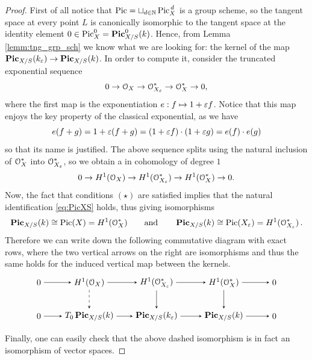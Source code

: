 	\begin{proof}
		First of all notice that $\operatorname{Pic} = \sqcup_{d\in \mathbb{N}}\operatorname{Pic}^{\,d}_X$ is a group scheme, so the tangent space at every point $L$ is canonically isomorphic to the tangent space at the identity element $ 0\in \operatorname{Pic}^0_X = \operatorname{\mathbf{Pic}}_{X/S}^0(k)$.
		Hence, from Lemma \ref{lemm:tng_grp_sch} we know what we are looking for: the kernel of the map $ \operatorname{\mathbf{Pic}}_{X/S}(k_\varepsilon)\to  \operatorname{\mathbf{Pic}}_{X/S}(k)$. In order to compute it, consider the truncated exponential sequence
		$$ 0 \to \mathcal{O}_X \to \mathcal{O}_{X_\varepsilon}^* \to \mathcal{O}_X^* \to 0, $$
		where the first map is the exponentiation $e: f\mapsto 1+\varepsilon f$. Notice that this map enjoys the key property of the classical exponential, as we have 
		$$ e(f + g) = 1+\varepsilon(f+g) = (1+\varepsilon f)\cdot(1+\varepsilon g) = e(f) \cdot e(g) $$
		so that its name is justified. The above sequence splits using the natural inclusion of $\mathcal{O}_X^*$ into $\mathcal{O}_{X_\varepsilon}^*$, so we obtain a \ses in cohomology of degree $1$
		$$ 0 \to H^1(\mathcal{O}_X) \to H^1(\mathcal{O}_{X_\varepsilon}^*) \to H^1(\mathcal{O}_X^*) \to 0. $$
		Now, the fact that conditions $(\star)$ are satisfied implies that the natural identification \eqref{eq:PicXS} holds, thus giving isomorphisms
		$$ \operatorname{\mathbf{Pic}}_{X/S}(k) \cong \operatorname{Pic}(X) = H^1(\mathcal{O}_X^*) \qquad \text{and} \qquad \operatorname{\mathbf{Pic}}_{X/S}(k) \cong \operatorname{Pic}(X_\varepsilon) = H^1(\mathcal{O}_{X_\varepsilon}^*)\,. $$
		Therefore we can write down the following commutative diagram with exact rows, where the two vertical arrows on the right are isomorphisms and thus the same holds for the induced vertical map between the kernels.
		$$
		\begin{tikzpicture}[node distance=4em, auto]
			\node (O) 															{$0$};
			\node (A) 	[right of=O, xshift=2em]		{$H^1(\OX)$};
			\node (A2) 	[right of=A]								{$\;$};
			\node (B) 	[right of=A2]								{$H^1(\calO_{X_\eps}^*)$};
			\node (B2) 	[right of=B]								{$\;$};
		  \node (C) 	[right of=B2] 							{$H^1(\OX^*)$};
		  \node (OO) 	[right of=C, xshift=2em] 		{$0$};
		  \node (O') 	[below of=O] 								{$0$};
		  \node (A') 	[below of=A] 								{$T_0 \PicXS(k)$};
		  \node (B') 	[below of=B] 								{$ \PicXS(k_\eps)$};
		  \node (C') 	[below of=C] 								{$ \PicXS(k)$};
		  \node (OO') [below of=OO] 							{$0$};
		  \draw[-stealth] 				(O)	to node {} (A);
		  \draw[-stealth]					(A)		to node {} (B);
		  \draw[-stealth]					(B)		to node {} (C);
		  \draw[-stealth]					(C)		to node {} (OO);
		  \draw[-stealth]					(O')	to node {} (A');
		  \draw[-stealth]					(A')	to node {} (B');
		  \draw[-stealth]					(B')	to node {} (C');
		  \draw[-stealth]					(C')	to node {} (OO');
		  \draw[-stealth][dashed]	(A)	to node {} (A');
		  \draw[-stealth]					(B)		to node {} (B');
		  \draw[-stealth]					(C)		to node {} (C');
		\end{tikzpicture}
		$$
		Finally, one can easily check that the above dashed isomorphism is in fact an isomorphism of vector spaces.
	\end{proof}

